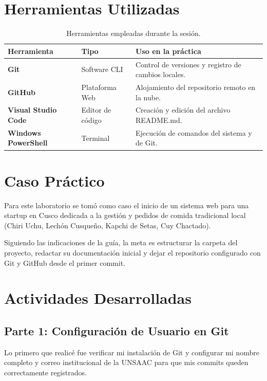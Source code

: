\documentclass[11pt,a4paper]{article}
\begin{document}
\section{Herramientas Utilizadas}
\begin{table}[H]
    \centering
    \begin{tabular}{@{}llp{8.5cm}@{}}
        \toprule
        \textbf{Herramienta} & \textbf{Tipo} & \textbf{Uso en la práctica} \\
        \midrule
        \textbf{Git} & Software CLI & Control de versiones y registro de cambios locales. \\
        \textbf{GitHub} & Plataforma Web & Alojamiento del repositorio remoto en la nube. \\
        \textbf{Visual Studio Code} & Editor de código & Creación y edición del archivo README.md. \\
        \textbf{Windows PowerShell} & Terminal & Ejecución de comandos del sistema y de Git. \\
        \bottomrule
    \end{tabular}
    \caption{Herramientas empleadas durante la sesión.}
\end{table}

\section{Caso Práctico}
Para este laboratorio se tomó como caso el inicio de un sistema web para una startup en Cusco dedicada a la gestión y pedidos de comida tradicional local (Chiri Uchu, Lechón Cusqueño, Kapchi de Setas, Cuy Chactado). 

Siguiendo las indicaciones de la guía, la meta es estructurar la carpeta del proyecto, redactar su documentación inicial y dejar el repositorio configurado con Git y GitHub desde el primer commit.

\section{Actividades Desarrolladas}

\subsection{Parte 1: Configuración de Usuario en Git}
Lo primero que realicé fue verificar mi instalación de Git y configurar mi nombre completo y correo institucional de la UNSAAC para que mis commits queden correctamente registrados.
\end{document}
